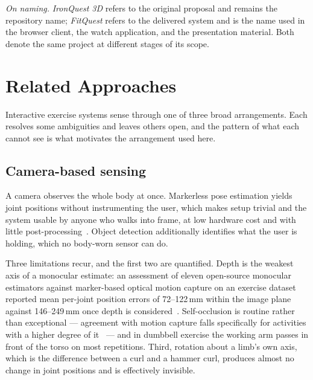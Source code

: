 \documentclass[11pt,a4paper]{article}
\begin{document}
\emph{On naming.} \emph{IronQuest 3D} refers to the original proposal and
remains the repository name; \emph{FitQuest} refers to the delivered system and
is the name used in the browser client, the watch application, and the
presentation material. Both denote the same project at different stages of its
scope.

\section{Related Approaches}
\label{sec:related}


Interactive exercise systems sense through one of three broad arrangements.
Each resolves some ambiguities and leaves others open, and the pattern of what
each cannot see is what motivates the arrangement used here.

\subsection{Camera-based sensing}

A camera observes the whole body at once. Markerless pose estimation yields
joint positions without instrumenting the user, which makes setup trivial and
the system usable by anyone who walks into frame, at low hardware cost and with
little post-processing~\cite{monopose}. Object detection additionally identifies
what the user is holding, which no body-worn sensor can do.

Three limitations recur, and the first two are quantified. Depth is the weakest
axis of a monocular estimate: an assessment of eleven open-source monocular
estimators against marker-based optical motion capture on an exercise dataset
reported mean per-joint position errors of 72--122\,mm within the image plane
against 146--249\,mm once depth is considered~\cite{monopose}. Self-occlusion is
routine rather than exceptional --- agreement with motion capture falls
specifically for activities with a higher degree of it~\cite{monopose} --- and in
dumbbell exercise the working arm passes in front of the torso on most
repetitions. Third, rotation about a limb's own axis, which is the difference
between a curl and a hammer curl, produces almost no change in joint positions
and is effectively invisible.
\end{document}
